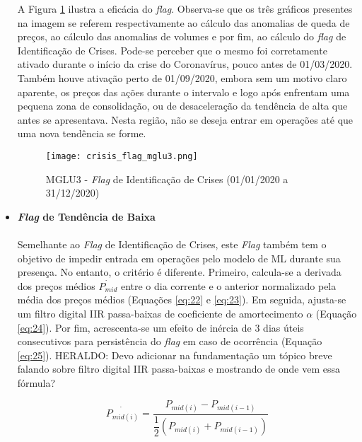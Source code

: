 \begin{itemize}
        A Figura \ref{fig:104} ilustra a eficácia do \textit{flag}. Observa-se que os três gráficos presentes na imagem se referem respectivamente ao cálculo das anomalias de queda de preços, ao cálculo das anomalias de volumes e por fim, ao cálculo do \textit{flag} de Identificação de Crises. Pode-se perceber que o mesmo foi corretamente ativado durante o início da crise do Coronavírus, pouco antes de 01/03/2020. Também houve ativação perto de 01/09/2020, embora sem um motivo claro aparente, os preços das ações durante o intervalo e logo após enfrentam uma pequena zona de consolidação, ou de desaceleração da tendência de alta que antes se apresentava. Nesta região, não se deseja entrar em operações até que uma nova tendência se forme.

        \begin{figure}[!htb]
            \texttt{[image: crisis\_flag\_mglu3.png]}
            \centering
            \caption{MGLU3 - \textit{Flag} de Identificação de Crises (01/01/2020 a 31/12/2020)}
            \label{fig:104}
        \end{figure}


    \item \textbf{\textit{Flag} de Tendência de Baixa} \\ \\
    Semelhante ao \textit{Flag} de Identificação de Crises, este \textit{Flag} também tem o objetivo de impedir entrada em operações pelo modelo de ML durante sua presença. No entanto, o critério é diferente. Primeiro, calcula-se a derivada dos preços médios \begin{math} \dot{P_{mid}} \end{math} entre o dia corrente e o anterior normalizado pela média dos preços médios (Equações \ref{eq:22} e \ref{eq:23}). Em seguida, ajusta-se um filtro digital IIR passa-baixas de coeficiente de amortecimento \begin{math} \alpha \end{math} (Equação \ref{eq:24}). Por fim, acrescenta-se um efeito de inércia de 3 dias úteis consecutivos para persistência do \textit{flag} em caso de ocorrência (Equação \ref{eq:25}). \color{red} HERALDO: Devo adicionar na fundamentação um tópico breve falando sobre filtro digital IIR passa-baixas e mostrando de onde vem essa fórmula? 

    \begin{equation} \label{eq:23}
        \dot{P_{mid(i)}} = \dfrac{ P_{mid(i)} - P_{mid(i-1)} }{ \dfrac{1}{2}(P_{mid(i)} + P_{mid(i-1)}) }
    \end{equation}


\end{itemize}

